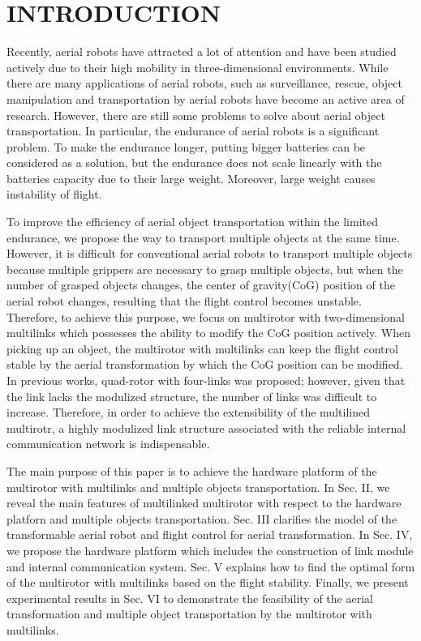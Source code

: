 \section{INTRODUCTION}
Recently, aerial robots have attracted a lot of attention and have been studied actively due to their high mobility in three-dimensional environments\cite{Kumar2012}. While there are many applications of aerial robots, such as surveillance\cite{surveillance}, rescue\cite{rescue}, object manipulation and transportation by aerial robots have become an active area of research\cite{lindsey2012}\cite{Mellinger2011}\cite{ZhaoISER2016}\cite{ZhaoICRA2017}\cite{Bernard2009}\cite{Hugh2012}. However, there are still some problems to solve about aerial object transportation. In particular, the endurance of aerial robots is a significant problem. To make the endurance longer, putting bigger batteries can be considered as a solution, but the endurance does not scale linearly with the batteries capacity due to their large weight. Moreover, large weight causes instability of flight.
\par
To improve the efficiency of aerial object transportation within the limited endurance, we propose the way to transport multiple objects at the same time. However, it is difficult for conventional aerial robots to transport multiple objects because multiple grippers are necessary to grasp multiple objects, but when the number of  grasped objects changes, the center of gravity(CoG) position of the aerial robot changes, resulting that the flight control becomes unstable. Therefore, to achieve this purpose, we focus on multirotor with two-dimensional multilinks\cite{Zhao2016} which possesses the ability to modify the CoG position actively. When picking up an object, the multirotor with multilinks can keep the flight control stable by the aerial transformation by which the CoG position can be modified. In previous works\cite{ZhaoISER2016}\cite{ZhaoICRA2017}\cite{Zhao2016}, quad-rotor with four-links was proposed; however, given that the link lacks the modulized structure, the number of links was difficult to increase. Therefore, in order to achieve the extensibility of the multilined multirotr, a highly modulized link structure associated with the reliable internal communication network is indispensable.
\par
The main purpose of this paper is to achieve the hardware platform of the multirotor with multilinks and multiple objects transportation. In Sec. II, we reveal the main features of multilinked multirotor with respect to the hardware platforn and  multiple objects transportation. Sec. III clarifies the model of the transformable aerial robot and flight control for aerial transformation. In Sec. IV, we propose the hardware platform which includes the construction of link module and internal communication system. Sec. V explains how to find the optimal form of the multirotor with multilinks based on the flight stability. Finally, we present experimental results in Sec. VI to demonstrate the feasibility of the aerial transformation and multiple object transportation by the multirotor with multilinks.
